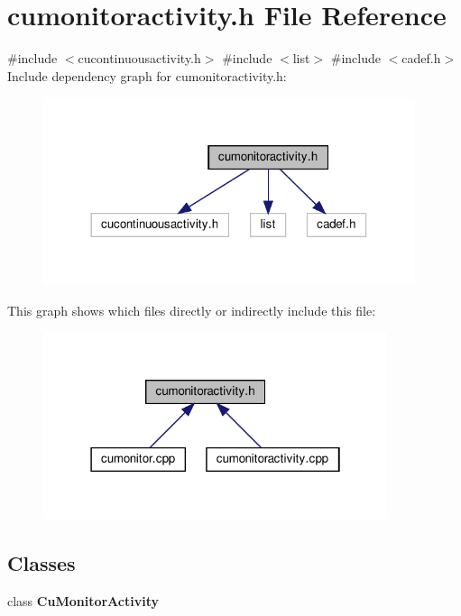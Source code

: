 \section{cumonitoractivity.\+h File Reference}
\label{cumonitoractivity_8h}
{\ttfamily \#include $<$cucontinuousactivity.\+h$>$}\newline
{\ttfamily \#include $<$list$>$}\newline
{\ttfamily \#include $<$cadef.\+h$>$}\newline
Include dependency graph for cumonitoractivity.\+h\+:\nopagebreak
\begin{figure}[H]
\begin{center}
\leavevmode
\includegraphics[width=309pt]{cumonitoractivity_8h__incl}
\end{center}
\end{figure}
This graph shows which files directly or indirectly include this file\+:\nopagebreak
\begin{figure}[H]
\begin{center}
\leavevmode
\includegraphics[width=286pt]{cumonitoractivity_8h__dep__incl}
\end{center}
\end{figure}
\subsection*{Classes}
\begin{DoxyCompactItemize}
\item 
class \textbf{ Cu\+Monitor\+Activity}
\end{DoxyCompactItemize}
